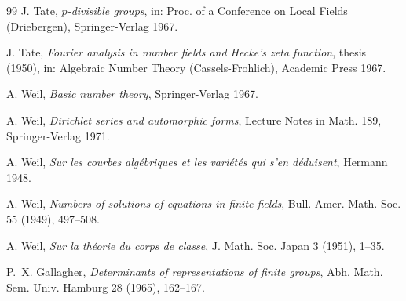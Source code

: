\documentclass[11pt,a4paper]{amsart}
\theoremstyle{plain}
\theoremstyle{definition}
\begin{document}
\begin{thebibliography}{99}
 J. Tate, \textit{$p$-divisible groups}, in: Proc. of a Conference on Local Fields (Driebergen), Springer-Verlag 1967.

 J. Tate, \textit{Fourier analysis in number fields and Hecke's zeta function}, thesis (1950), in: Algebraic Number Theory (Cassels-Frohlich), Academic Press 1967.

 A. Weil, \textit{Basic number theory}, Springer-Verlag 1967.

 A. Weil, \textit{Dirichlet series and automorphic forms}, Lecture Notes in Math. 189, Springer-Verlag 1971.

 A. Weil, \textit{Sur les courbes alg\'ebriques et les vari\'et\'es qui s'en d\'eduisent}, Hermann 1948.

 A. Weil, \textit{Numbers of solutions of equations in finite fields}, Bull. Amer. Math. Soc. 55 (1949), 497--508.

 A. Weil, \textit{Sur la th\'eorie du corps de classe}, J. Math. Soc. Japan 3 (1951), 1--35.

 P.~X. Gallagher, \textit{Determinants of representations of finite groups}, Abh. Math. Sem. Univ. Hamburg 28 (1965), 162--167.

\end{thebibliography}
\end{document}
